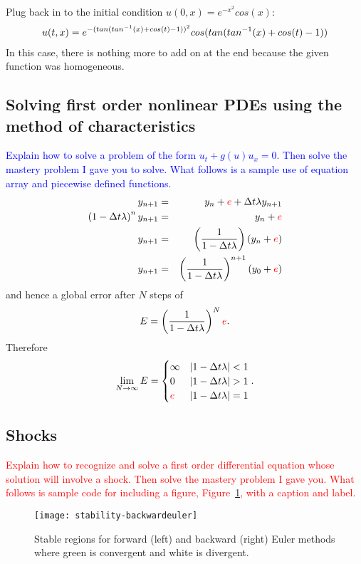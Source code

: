 \documentclass{article}
\newcommand{\bea}{\begin{eqnarray*}}
\newcommand{\eea}{\end{eqnarray*}}
\newcommand{\red}[1]{\textcolor{red}{#1}}
\newcommand{\blue}[1]{\textcolor{blue}{#1}}
\begin{document}
Plug back in to the initial condition $u(0,x) = e^{-x^2}cos(x)$:
\bea
u(t,x) = e^{-(tan(tan^{-1}(x) + cos(t) - 1))^2}cos(tan(tan^{-1}(x) + cos(t) - 1))\newline
\eea
In this case, there is nothing more to add on at the end because the given function was homogeneous.




\subsection{Solving first order nonlinear PDEs using the method of characteristics}

\blue{Explain how to solve a problem of the form $u_t+g(u)u_x=0$. Then solve the mastery problem I gave you to solve. What follows is a sample use of equation array and piecewise defined functions.}
  \bea
y_{n+1} &=& y_n+\red{e} + \Delta t \lambda y_{n+1} \\
\left(1-\Delta t
\lambda\right)^ny_{n+1} &=& y_n+\red{e} \\
y_{n+1} &=& \left(\frac{1}{1-\Delta t \lambda}\right)(y_n+\red{e}) \\
y_{n+1} &=& \left(\frac{1}{1-\Delta t \lambda}\right)^{n+1}(y_0+\red{e}) 
\eea
and hence a global error after $N$ steps of
$$E = \left(\frac{1}{1-\Delta t \lambda}\right)^N\red{e}.$$ Therefore
$$\lim_{N\to \infty} E = \begin{cases} \infty & 
  |1-\Delta t \lambda|<1 \\
 0 &  |1-\Delta t \lambda|>1 \\
  \red{e} & |1-\Delta t \lambda|=1
  \end{cases}.$$
\subsection{Shocks}
\red{Explain how to recognize and solve a first order differential equation whose solution will involve a shock. Then solve the mastery problem I gave you. What follows is sample code for including a figure, Figure~\ref{fig:example}, with a caption and label.}
\begin{figure}[ht]
\begin{center}
  \texttt{[image: stability-backwardeuler]}
  \end{center}
\caption{Stable regions for forward (left) and backward (right) Euler methods where green is
  convergent and white is divergent. \label{fig:example}}
\end{figure}
\end{document}
